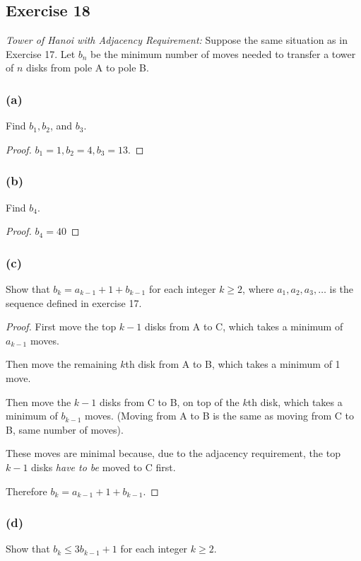 \documentclass[14pt]{extarticle}
\begin{document}
\subsection{Exercise 18}
{\it Tower of Hanoi with Adjacency Requirement:} Suppose the same situation as in Exercise 17. Let $b_n$ be the minimum number of moves needed to transfer a tower of $n$ disks from pole A to pole B.

\subsubsection{(a)}
Find $b_1, b_2$, and $b_3$.

\begin{proof}
    $b_1 = 1, b_2 = 4, b_3 = 13$.
\end{proof}

\subsubsection{(b)}
Find $b_4$.

\begin{proof}
    $b_4 = 40$
\end{proof}

\subsubsection{(c)}
Show that $b_k = a_{k - 1} + 1 + b_{k - 1}$ for each integer $k \geq 2$, where $a_1, a_2, a_3, \ldots$ is the
sequence defined in exercise 17.

\begin{proof}
    First move the top $k-1$ disks from A to C, which takes a minimum of $a_{k-1}$ moves.

    Then move the remaining $k$th disk from A to B, which takes a minimum of 1 move.

    Then move the $k-1$ disks from C to B, on top of the $k$th disk, which takes a minimum of $b_{k-1}$ moves.
    (Moving from A to B is the same as moving from C to B, same number of moves).

    These moves are minimal because, due to the adjacency requirement, the top $k-1$ disks {\it have to be} moved
    to C first.

    Therefore $b_k = a_{k - 1} + 1 + b_{k - 1}$.
\end{proof}

\subsubsection{(d)}
Show that $b_k \leq 3b_{k - 1} + 1$ for each integer $k \geq 2$.
\end{document}
